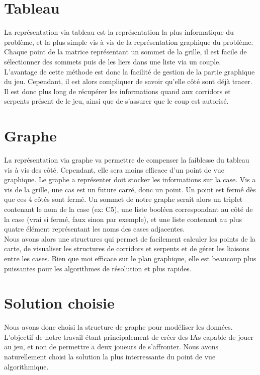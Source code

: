 \documentclass[a4paper,12pt]{report}
\begin{document}
\section{Tableau}

La repr\'esentation via tableau est la repr\'esentation la plus informatique du probl\`eme, et la plus simple vis \`a vis de la repr\'esentation graphique du probl\`eme. Chaque point de la matrice repr\'esentant un sommet de la grille, il est facile de s\'electionner des sommets puis de les liers dans une liste via un couple.\\
L'avantage de cette m\'ethode est donc la facilit\'e de gestion de la partie graphique du jeu. Cependant, il est alors compliquer de savoir qu'elle c\^ot\'e sont d\'ej\`a tracer. Il est donc plus long de r\'ecup\'erer les informations quand aux corridors et serpents pr\'esent de le jeu, ainsi que de s'assurer que le coup est autoris\'e.

\section{Graphe}

La repr\'esentation via graphe va permettre de compenser la faiblesse du tableau vis \`a vis des c\^ot\'e. Cependant, elle sera moins efficace d'un point de vue graphique. Le graphe a repr\'esenter doit stocker les informations sur la case. Vis a vis de la grille, une cas est un future carr\'e, donc un point. Un point est ferm\'e d\`es que ces 4 c\^ot\'es sont ferm\'e. Un sommet de notre graphe serait alors un triplet contenant le nom de la case (ex: C5), une liste bool\'een correspondant au c\^ot\'e de la case (vrai si ferm\'e, faux sinon par exemple), et une liste contenant au plus quatre \'el\'ement repr\'esentant les noms des cases adjacentes. \\
Nous avons alors une structures qui permet de facilement calculer les points de la carte, de visualiser les structures de corridors et serpents et de g\'erer les liaisons entre les cases. Bien que moi efficace sur le plan graphique, elle est beaucoup plus puissantes pour les algorithmes de r\'esolution et plus rapides. 

\section{Solution choisie}

Nous avons donc choisi la structure de graphe pour mod\'eliser les donn\'ees. L'objectif de notre travail \'etant principalement de cr\'eer des IAs capable de jouer au jeu, et non de permettre a deux joueurs de s'affronter. Nous avons naturellement choisi la solution la plus interressante du point de vue algorithmique. 
\end{document}
